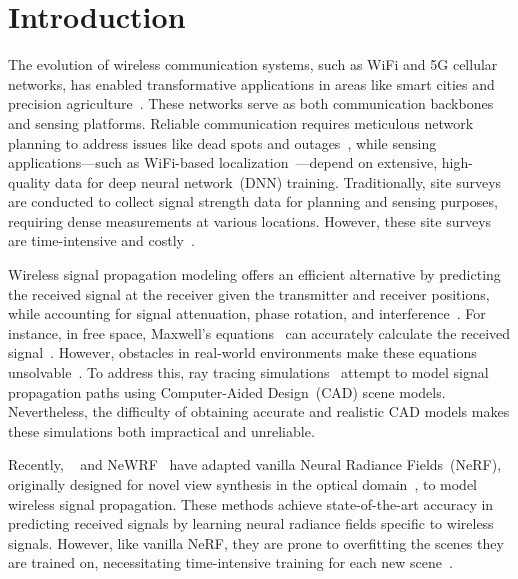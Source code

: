 \section{Introduction}\label{sec_introduction}



The evolution of wireless communication systems, such as WiFi and 5G cellular networks, has enabled transformative applications in areas like smart cities and precision agriculture~\cite{gadre2020frequency, tong2023citywide}. 
These networks serve as both communication backbones and sensing platforms. 
Reliable communication requires meticulous network planning to address issues like dead spots and outages~\cite{ahamed20215g}, while sensing applications—such as WiFi-based localization~\cite{ayyalasomayajula2020deep, yang2024orchloc, savvides2001dynamic}—depend on extensive, high-quality data for deep neural network~(DNN) training. 
Traditionally, site surveys~\cite{kar2018site} are conducted to collect signal strength data for planning and sensing purposes, requiring dense measurements at various locations. 
However, these site surveys are time-intensive and costly~\cite{site_survey_cisco}.


Wireless signal propagation modeling offers an efficient alternative by predicting the received signal at the receiver given the transmitter and receiver positions, while accounting for signal attenuation, phase rotation, and interference~\cite{1451581, na2022huygens}. 
For instance, in free space, Maxwell's equations~\cite{maxwell1873treatise} can accurately calculate the received signal~\cite{wong1984conductivity}. 
However, obstacles in real-world environments make these equations unsolvable~\cite{zhao2000integral}.
To address this, ray tracing simulations~\cite{yun2015ray, egea2021opal, matlab_indoor_simulation} attempt to model signal propagation paths using Computer-Aided Design~(CAD) scene models. 
Nevertheless, the difficulty of obtaining accurate and realistic CAD models makes these simulations both impractical and unreliable.



Recently, \nerft~\cite{zhao2023nerf} and NeWRF~\cite{lunewrf} have adapted vanilla Neural Radiance Fields~(NeRF), originally designed for novel view synthesis in the optical domain~\cite{tancik2022block, liu2020neural}, to model wireless signal propagation. 
These methods achieve state-of-the-art accuracy in predicting received signals by learning neural radiance fields specific to wireless signals.
However, like vanilla NeRF, they are prone to overfitting the scenes they are trained on, necessitating time-intensive training for each new scene~\cite{wang2021ibrnet, liu2022neural}.


